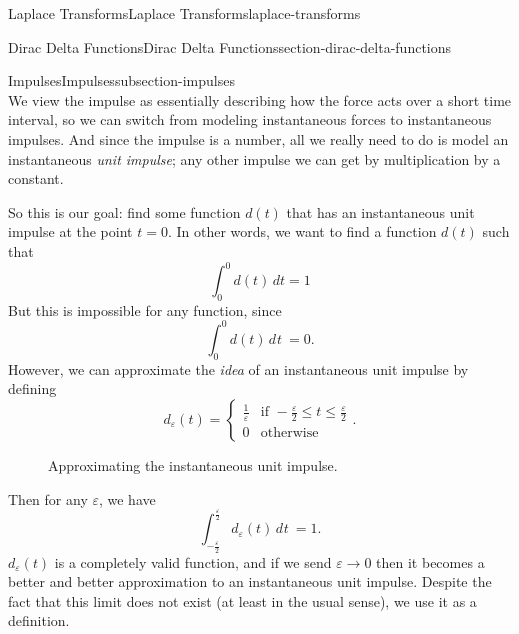 \documentclass[oneside,10pt,]{book}
\numberwithin{equation}{section}
\newcommand{\Int}[2]{\int_{#1}^{#2}}
\newcommand{\dd}[2][]{\, d^{#1} #2\ }
\newcommand{\amp}{&}
\begin{document}
\begin{chapterptx}{Laplace Transforms}{}{Laplace Transforms}{}{}{laplace-transforms}
\begin{sectionptx}{Dirac Delta Functions}{}{Dirac Delta Functions}{}{}{section-dirac-delta-functions}
\begin{subsectionptx}{Impulses}{}{Impulses}{}{}{subsection-impulses}
\begin{equation*}
\end{equation*}
We view the impulse as essentially describing how the force acts over a short time interval, so we can switch from modeling instantaneous forces to instantaneous impulses. And since the impulse is a number, all we really need to do is model an instantaneous \emph{unit impulse}; any other impulse we can get by multiplication by a constant.%
\par
\hypertarget{p-532}{}%
So this is our goal: find some function \(d(t)\) that has an instantaneous unit impulse at the point \(t=0\). In other words, we want to find a function \(d(t)\) such that%
\begin{equation*}
\int_{0}^{0}d(t)\,dt = 1
\end{equation*}
But this is impossible for any function, since%
\begin{equation*}
\Int{0}{0}d(t)\dd{t} = 0.
\end{equation*}
However, we can approximate the \emph{idea} of an instantaneous unit impulse by defining%
\begin{equation*}
d_{\varepsilon}(t) = 
\begin{cases}
\frac{1}{\varepsilon} \amp\text{if }-\frac{\varepsilon}{2}\leq t\leq \frac{\varepsilon}{2} \\
0 \amp\text{otherwise}  
\end{cases}.
\end{equation*}
\begin{figure}
\centering
{
}
\caption{Approximating the instantaneous unit impulse.\label{figure-approximation-unit-impulse}}
\end{figure}
%
\par
\hypertarget{p-533}{}%
Then for any \(\varepsilon\), we have%
\begin{equation*}
\Int{-\frac{\varepsilon}{2}}{\frac{\varepsilon}{2}}d_{\varepsilon}(t)\dd{t} = 1.
\end{equation*}
\(d_{\varepsilon}(t)\) is a completely valid function, and if we send \(\varepsilon\to0\) then it becomes a better and better approximation to an instantaneous unit impulse. Despite the fact that this limit does not exist (at least in the usual sense), we use it as a definition.%

\end{subsectionptx}
\end{sectionptx}
\end{chapterptx}
\end{document}
